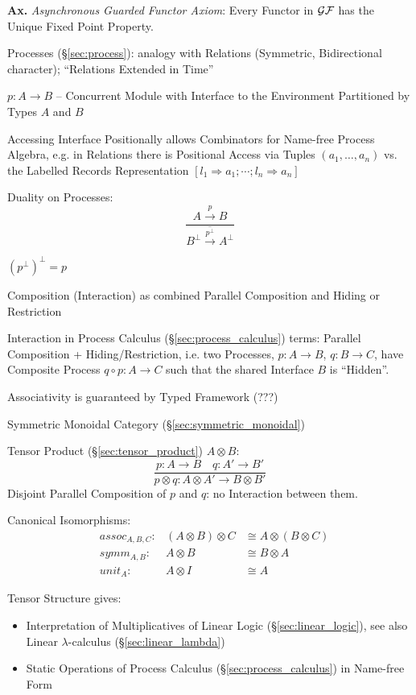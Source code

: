 \textbf{Ax.} \emph{Asynchronous Guarded Functor Axiom}: Every Functor
in $\mathcal{GF}$ has the Unique Fixed Point Property.


\asterism


Processes (\S\ref{sec:process}): analogy with Relations (Symmetric,
Bidirectional character); ``Relations Extended in Time''

$p : A \rightarrow B$ -- Concurrent Module with Interface to the
Environment Partitioned by Types $A$ and $B$

Accessing Interface Positionally allows Combinators for Name-free
Process Algebra, e.g. in Relations there is Positional Access via
Tuples $(a_1, \ldots, a_n)$ vs. the Labelled Records Representation $[
  l_1 \Rightarrow a_1; \cdots ; l_n \Rightarrow a_n]$

Duality on Processes:
\[
  \frac{A \xrightarrow{p} B}
  {\overline{B^\bot \xrightarrow{p^\bot} A^\bot}}
\]

$(p^\bot)^\bot = p$

Composition (Interaction) as combined Parallel Composition and Hiding
or Restriction

Interaction in Process Calculus (\S\ref{sec:process_calculus}) terms:
Parallel Composition + Hiding/Restriction, i.e. two Processes, $p : A
\rightarrow B$, $q : B \rightarrow C$, have Composite Process $q \circ
p : A \rightarrow C$ such that the shared Interface $B$ is ``Hidden''.

Associativity is guaranteed by Typed Framework (???)

Symmetric Monoidal Category (\S\ref{sec:symmetric_monoidal})

Tensor Product (\S\ref{sec:tensor_product}) $A \otimes B$:
\[
  \frac{p : A \rightarrow B \quad q : A' \rightarrow B'}
  {p \otimes q : A \otimes A' \rightarrow B \otimes B'}
\]
Disjoint Parallel Composition of $p$ and $q$: no Interaction between
them.

Canonical Isomorphisms:
\begin{align*}
  & assoc_{A,B,C} : & (A \otimes B) \otimes C & \cong
    A \otimes (B \otimes C) \\
  & symm_{A,B} : & A \otimes B & \cong B \otimes A \\
  & unit_A : & A \otimes I & \cong A
\end{align*}

Tensor Structure gives:
\begin{itemize}
  \item Interpretation of Multiplicatives of Linear Logic
    (\S\ref{sec:linear_logic}), see also Linear $\lambda$-calculus
    (\S\ref{sec:linear_lambda})
  \item Static Operations of Process Calculus
    (\S\ref{sec:process_calculus}) in Name-free Form
\end{itemize}

